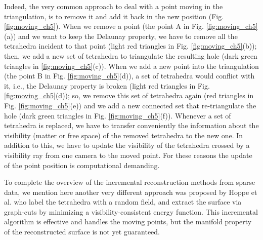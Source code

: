 Indeed, the very common approach to deal with a point moving in the triangulation, is to remove it and add it back in the new position \cite{cgal} (Fig. \ref{fig:moving_ch5}). 
When we remove a point (the point A in Fig. \ref{fig:moving_ch5}(a)) and we want to keep the Delaunay property, we have to remove all the tetrahedra incident to that point (light red triangles in Fig. \ref{fig:moving_ch5}(b)); then, we add a new set of tetrahedra to triangulate the resulting hole (dark green triangles in \ref{fig:moving_ch5}(c)).
When we add a new point into the triangulation  (the point B in Fig. \ref{fig:moving_ch5}(d)), a set of tetrahedra would conflict with it, i.e., the Delaunay property is broken (light red triangles in Fig. \ref{fig:moving_ch5}(d)); so, we remove this set of tetrahedra again (red triangles in Fig. \ref{fig:moving_ch5}(e)) and we add a new connected set that re-triangulate the hole (dark green triangles in Fig. \ref{fig:moving_ch5}(f)).
Whenever a set of tetrahedra is replaced, we have to transfer conveniently the information about the visibility (matter or free space) of the removed tetrahedra to the new one. 
In addition to this, we have to update the visibility of the tetrahedra crossed by a visibility ray from one camera to the moved point.
For these reasons the update of the point position is computational demanding.

To complete the overview of the incremental reconstruction methods from sparse data, we mention here another very different approach was proposed by Hoppe et al. \cite{Hoppe13} who label the tetrahedra with a random field, and extract the surface via graph-cuts by minimizing a visibility-consistent energy function. This incremental algorithm is effective and handles the moving points, but the manifold property of the reconstructed surface is not yet guaranteed.

